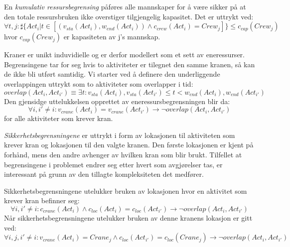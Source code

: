 En \textit{kumulativ ressursbegrensing} påføres alle mannskaper for å være sikker på at den totale ressursbruken ikke overstiger tilgjengelig kapasitet. Det er uttrykt ved: 
\begin{equation}
\forall t,j : \sharp \{ Act_{i} | t \in [(v_{sta}(Act_{i}), w_{end}(Act_{i})) \wedge c_{crew}(Act_{i}) = Crew_{j}] \} \leq c_{cap}(Crew_{j})
\end{equation}
hvor $ c_{cap}(Crew_{j}) $ er kapasiteten av j's mannskap.

Kraner er unikt induvidielle og er derfor modellert som et sett av eneressurser. Begrensingene tar for seg hvis to aktiviteter er tilegnet den samme kranen, så kan de ikke bli utført samtidig. Vi starter ved å definere den underliggende overlappingen uttrykt som to aktiviteter som overlapper i tid: 
\begin{equation}
overlap(Act_{i},Act_{i'}) \equiv \exists t : v_{sta}(Act_{i}),v_{sta}(Act_{i'}) \leq t < w_{end}(Act_{i}),w_{end}(Act_{i'})
\end{equation}
Den gjensidge uttelukkelsen opprettet av eneressursbegrensningen blir da: 
\begin{equation}
\forall i,i' \neq i : v_{crane}(Act_{i}) = v_{crane}(Act_{i'}) \rightarrow \neg overlap(Act_{i},Act_{i'})
\end{equation}
for alle aktiviteter som krever kran.

\textit{Sikkerhetsbegrensningene} er uttrykt i form av lokasjonen til aktiviteten som krever kran og lokasjonen til den valgte kranen. Den første lokasjonen er kjent på forhånd, mens den andre avhenger av hvilken kran som blir brukt. Tilfellet at begrensingene i problemet endrer seg etter hvert som avgjørelser tas, er interessant på grunn av den tillagte kompleksiteten det medfører.

Sikkerhetsbegrensningene utelukker bruken av lokasjonen hvor en aktivitet som krever kran befinner seg:
\begin{equation}
\forall i,i' \neq i : c_{crane}(Act_{i}) \wedge c_{loc}(Act_{i}) = c_{loc}(Act_{i'}) \rightarrow \neg overlap(Act_{i},Act_{i'})
\end{equation}
Når sikkerhetsbegrensningene utelukker bruken av denne kranens lokasjon er gitt ved:
\begin{equation}
\forall i,j,i' \neq i : v_{crane}(Act_{i}) = Crane_{j} \wedge c_{loc}(Act_{i'}) = c_{loc}(Crane_{j}) \rightarrow \neg overlap(Act_{i},Act_{i'})
\label{eq:sikkerhetsbegutelukkerkran}
\end{equation}

